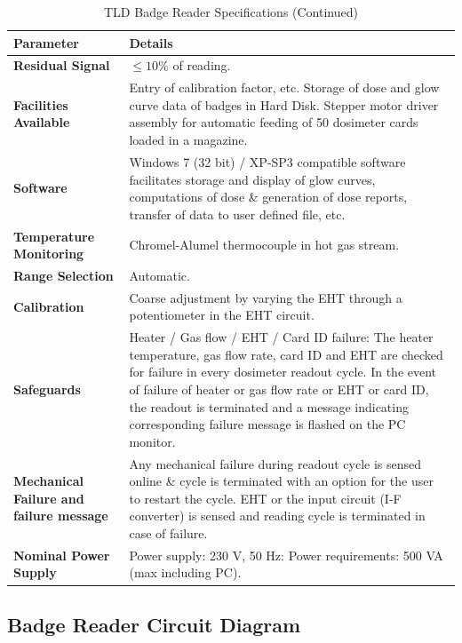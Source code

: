 \begin{table}[H]
    \centering
    \caption{TLD Badge Reader Specifications (Continued)}
    \begin{tabular}{|p{4.5cm}|p{10cm}|}
        \hline
        \textbf{Parameter} & \textbf{Details} \\
        \hline
        \textbf{Residual Signal} & $\leq 10 \%$ of reading. \\
        \hline
        \textbf{Facilities Available} & Entry of calibration factor, etc. Storage of dose and glow curve data of badges in Hard Disk. Stepper motor driver assembly for automatic feeding of 50 dosimeter cards loaded in a magazine. \\
        \hline
        \textbf{Software} & Windows 7 (32 bit) / XP-SP3 compatible software facilitates storage and display of glow curves, computations of dose \& generation of dose reports, transfer of data to user defined file, etc. \\
        \hline
        \textbf{Temperature Monitoring} & Chromel-Alumel thermocouple in hot gas stream. \\
        \hline
        \textbf{Range Selection} & Automatic. \\
        \hline
        \textbf{Calibration} & Coarse adjustment by varying the EHT through a potentiometer in the EHT circuit. \\
        \hline
        \textbf{Safeguards} & Heater / Gas flow / EHT / Card ID failure: The heater temperature, gas flow rate, card ID and EHT are checked for failure in every dosimeter readout cycle. In the event of failure of heater or gas flow rate or EHT or card ID, the readout is terminated and a message indicating corresponding failure message is flashed on the PC monitor. \\
        \hline
        \textbf{Mechanical Failure and failure message} & Any mechanical failure during readout cycle is sensed online \& cycle is terminated with an option for the user to restart the cycle. EHT or the input circuit (I-F converter) is sensed and reading cycle is terminated in case of failure. \\
        \hline
        \textbf{Nominal Power Supply} & Power supply: 230 V, 50 Hz: Power requirements: 500 VA (max including PC). \\
        \hline
    \end{tabular}
\end{table}

\subsection{Badge Reader Circuit Diagram}

